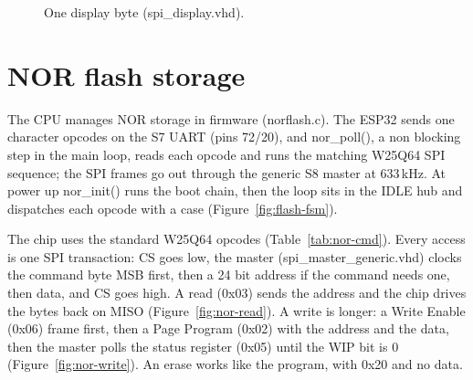 \documentclass[a4paper,10pt]{article}
\newcommand{\clkspan}[4]{%
  \pgfmathtruncatemacro{\nn}{((#2)-(#1))/#4 - 1}%
  \foreach \i in {0,...,\nn}{%
    \draw[line width=0.4pt]
      ({#1+\i*#4},{#3-0.14})--({#1+\i*#4+0.5*#4},{#3-0.14})
      --({#1+\i*#4+0.5*#4},{#3+0.14})--({#1+(\i+1)*#4},{#3+0.14})--({#1+(\i+1)*#4},{#3-0.14});}}
\newcommand{\sgrid}[5]{%
  \foreach \i in {0,...,#2}{\draw[black!12, line width=0.3pt]
      ({#1+\i*#3},{#4}) -- ({#1+\i*#3},{#5});}}
\begin{document}
\begin{figure}[H]
\centering
{}
\caption{One display byte (spi\_display.vhd).}
\label{fig:disp-wave}
\end{figure}

\section{NOR flash storage}
\label{sec:flash}

The CPU manages NOR storage in firmware (norflash.c). The ESP32 sends one
character opcodes on the S7 UART (pins 72/20), and nor\_poll(), a non blocking
step in the main loop, reads each opcode and runs the matching W25Q64 SPI sequence; the
SPI frames go out through the generic S8 master at 633\,kHz. At power up
nor\_init() runs the boot chain, then the loop sits in the IDLE hub and
dispatches each opcode with a case (Figure~\ref{fig:flash-fsm}).

The chip uses the standard W25Q64 opcodes (Table~\ref{tab:nor-cmd}). Every access is one
SPI transaction: CS goes low, the master (spi\_master\_generic.vhd) clocks the
command byte MSB first, then a 24 bit address if the command needs one, then data, and CS
goes high. A read (0x03) sends the address and the chip drives the bytes back on
MISO (Figure~\ref{fig:nor-read}). A write is longer: a Write Enable (0x06) frame
first, then a Page Program (0x02) with the address and the data, then the master
polls the status register (0x05) until the WIP bit is 0
(Figure~\ref{fig:nor-write}). An erase works like the program, with 0x20 and no
data.
\end{document}
